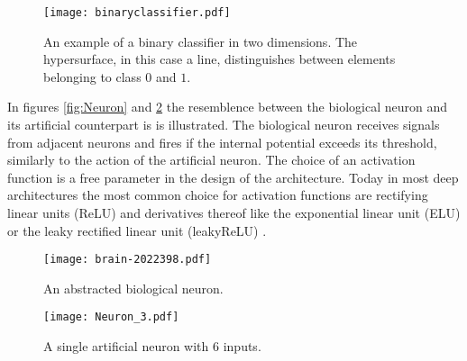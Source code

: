 \begin{figure}[H]
\centering
  \texttt{[image: binaryclassifier.pdf]}
  \caption{An example of a binary classifier in two dimensions. The hypersurface, in this case a line, distinguishes between elements belonging to class $0$ and $1$.}
  \label{fig:binaryclassifier}
\end{figure}

In figures \ref{fig:Neuron}  and \ref{fig:ArtNeuron} the resemblence between the biological neuron and its artificial counterpart is is illustrated. The biological neuron receives signals from adjacent neurons and fires if the internal potential exceeds its threshold, similarly to the action of the artificial neuron.
The choice of an activation function is a free parameter in the design of the architecture. Today in most deep architectures the most common choice for activation functions are rectifying linear units (ReLU) and derivatives thereof like the exponential linear unit (ELU) \cite{Clevert2015} or the leaky rectified linear unit (leakyReLU) \cite{Maas2013}.

\begin{figure}[H]
\centering
  \texttt{[image: brain-2022398.pdf]}
  \caption{An abstracted biological neuron.}
  \label{fig:Neuron}
  \texttt{[image: Neuron\_3.pdf]}
  \caption{A single artificial neuron with $6$ inputs.}
  \label{fig:ArtNeuron}
\end{figure}



